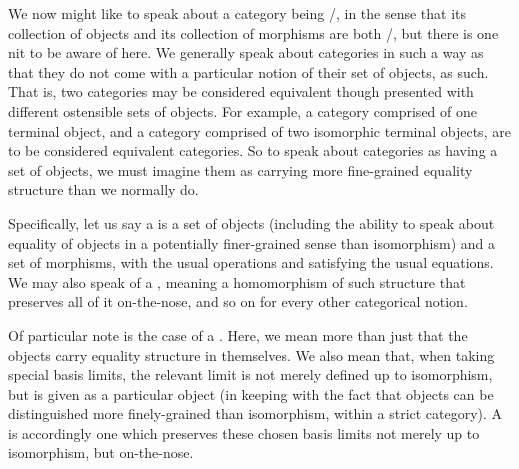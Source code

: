 We now might like to speak about a category being \repsmall/, in the sense that its collection of objects and its collection of morphisms are both \repsmall/, but there is one nit to be aware of here. We generally speak about categories in such a way as that they do not come with a particular notion of their set of objects, as such. That is, two categories may be considered equivalent though presented with different ostensible sets of objects. For example, a category comprised of one terminal object, and a category comprised of two isomorphic terminal objects, are to be considered equivalent categories. So to speak about categories as having a set of objects, we must imagine them as carrying more fine-grained equality structure than we normally do.

\begin{definition}
Specifically, let us say a  is a set of objects (including the ability to speak about equality of objects in a potentially finer-grained sense than isomorphism) and a set of morphisms, with the usual operations and satisfying the usual equations.  We may also speak of a , meaning a homomorphism of such structure that preserves all of it on-the-nose, and so on for every other categorical notion.
\end{definition}

\begin{definition}
Of particular note is the case of a . Here, we mean more than just that the objects carry equality structure in themselves. We also mean that, when taking special basis limits, the relevant limit is not merely defined up to isomorphism, but is given as a particular object (in keeping with the fact that objects can be distinguished more finely-grained than isomorphism, within a strict category). A  is accordingly one which preserves these chosen basis limits not merely up to isomorphism, but on-the-nose. 
\end{definition}


